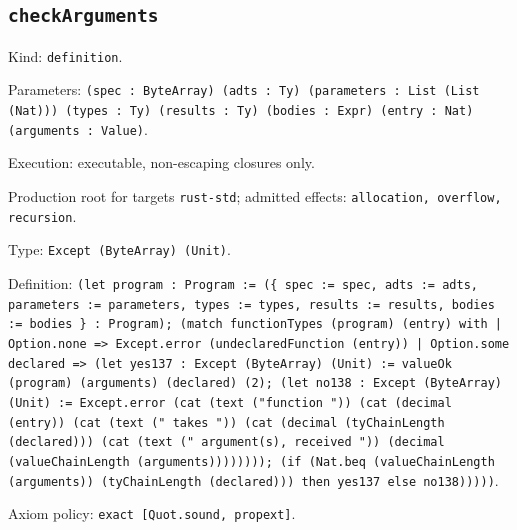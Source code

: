 \documentclass[11pt]{article}
\begin{document}
\subsection*{\texttt{checkArguments}}
\noindent Kind: \texttt{definition}.\par
\noindent Parameters: \texttt{(spec : ByteArray) (adts : Ty) (parameters : List (List (Nat))) (types : Ty) (results : Ty) (bodies : Expr) (entry : Nat) (arguments : Value)}.\par
\noindent Execution: executable, non-escaping closures only.\par
\noindent Production root for targets \texttt{rust-std}; admitted effects: \texttt{allocation, overflow, recursion}.\par
\noindent Type: \texttt{Except (ByteArray) (Unit)}.\par
\noindent Definition: \texttt{(let program : Program := (\{ spec := spec, adts := adts, parameters := parameters, types := types, results := results, bodies := bodies \} : Program); (match functionTypes (program) (entry) with | Option.none => Except.error (undeclaredFunction (entry)) | Option.some declared => (let yes137 : Except (ByteArray) (Unit) := valueOk (program) (arguments) (declared) (2); (let no138 : Except (ByteArray) (Unit) := Except.error (cat (text ("function ")) (cat (decimal (entry)) (cat (text (" takes ")) (cat (decimal (tyChainLength (declared))) (cat (text (" argument(s), received ")) (decimal (valueChainLength (arguments)))))))); (if (Nat.beq (valueChainLength (arguments)) (tyChainLength (declared))) then yes137 else no138)))))}.\par
\noindent Axiom policy: \texttt{exact [Quot.sound, propext]}.\par
\end{document}

